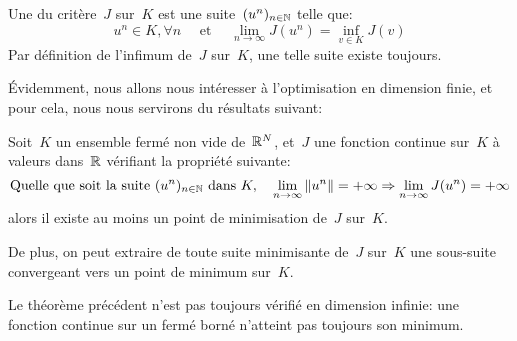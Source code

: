 \begin{definition}
Une  du critère~$J$ sur~$K$ est une suite~$(u^n)_{n\in\mathbb N}$ telle que:
\begin{equation}
u^n\in K, \forall n \quad\text{ et }\quad \lim_{n\rightarrow\infty} J(u^n)=\inf_{v\in K} J(v)
\end{equation}
Par définition de l'infimum de~$J$ sur~$K$, une telle suite existe toujours.
\end{definition}
Évidemment, nous allons nous intéresser à l'optimisation en dimension finie, et pour cela, nous nous servirons du résultats suivant:
\begin{theoreme}[Optimisation en dimension finie~$V=\RR^N$]
Soit~$K$ un ensemble fermé non vide de~$\mathbb R^N$, et~$J$ une fonction continue sur~$K$ à valeurs dans~$\mathbb R$ vérifiant la propriété  suivante:
\begin{equation}\label{Eq-infinieinfini}\colorblue
\text{Quelle que soit la suite } (u^n)_{n\in\NN} \text{ dans }K,
\quad \lim_{n\rightarrow\infty}\|u^n\|=+\infty \Rightarrow \lim_{n\rightarrow\infty}J(u^n)=+\infty
\end{equation}
alors il existe au moins un point de minimisation de~$J$ sur~$K$.

De plus, on peut extraire de toute suite minimisante de~$J$ sur~$K$ une sous-suite convergeant vers un point de minimum sur~$K$.
\end{theoreme}
\begin{remarque}
Le théorème précédent n'est pas toujours vérifié en dimension infinie: une fonction continue sur un fermé borné n'atteint pas toujours son minimum.
\end{remarque}

